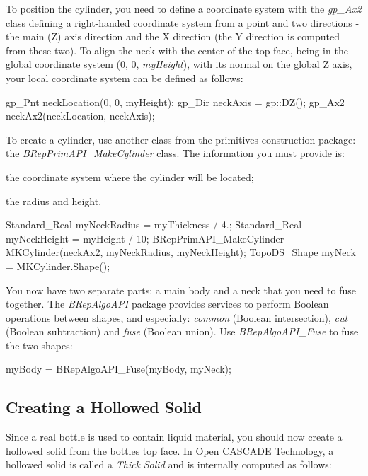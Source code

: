 To position the cylinder, you need to define a coordinate system with the {\itshape gp\+\_\+\+Ax2} class defining a right-\/handed coordinate system from a point and two directions -\/ the main (Z) axis direction and the X direction (the Y direction is computed from these two). To align the neck with the center of the top face, being in the global coordinate system (0, 0, {\itshape my\+Height}), with its normal on the global Z axis, your local coordinate system can be defined as follows\+:


\begin{DoxyCode}
gp\_Pnt neckLocation(0, 0, myHeight);
gp\_Dir neckAxis = gp::DZ();
gp\_Ax2 neckAx2(neckLocation, neckAxis);
\end{DoxyCode}


To create a cylinder, use another class from the primitives construction package\+: the {\itshape B\+Rep\+Prim\+A\+P\+I\+\_\+\+Make\+Cylinder} class. The information you must provide is\+:


\begin{DoxyItemize}
\item the coordinate system where the cylinder will be located;
\item the radius and height.
\end{DoxyItemize}


\begin{DoxyCode}
Standard\_Real myNeckRadius = myThickness / 4.;
Standard\_Real myNeckHeight = myHeight / 10;
BRepPrimAPI\_MakeCylinder MKCylinder(neckAx2, myNeckRadius, myNeckHeight);
TopoDS\_Shape myNeck = MKCylinder.Shape();
\end{DoxyCode}


You now have two separate parts\+: a main body and a neck that you need to fuse together. The {\itshape B\+Rep\+Algo\+A\+PI} package provides services to perform Boolean operations between shapes, and especially\+: {\itshape common} (Boolean intersection), {\itshape cut} (Boolean subtraction) and {\itshape fuse} (Boolean union). Use {\itshape B\+Rep\+Algo\+A\+P\+I\+\_\+\+Fuse} to fuse the two shapes\+:


\begin{DoxyCode}
myBody = BRepAlgoAPI\_Fuse(myBody, myNeck);
\end{DoxyCode}
\hypertarget{occt__tutorial_OCCT_TUTORIAL_SUB3_4}{}\subsection{Creating a Hollowed Solid}\label{occt__tutorial_OCCT_TUTORIAL_SUB3_4}
Since a real bottle is used to contain liquid material, you should now create a hollowed solid from the bottle\textquotesingle{}s top face. In Open C\+A\+S\+C\+A\+DE Technology, a hollowed solid is called a {\itshape Thick} {\itshape Solid} and is internally computed as follows\+:


